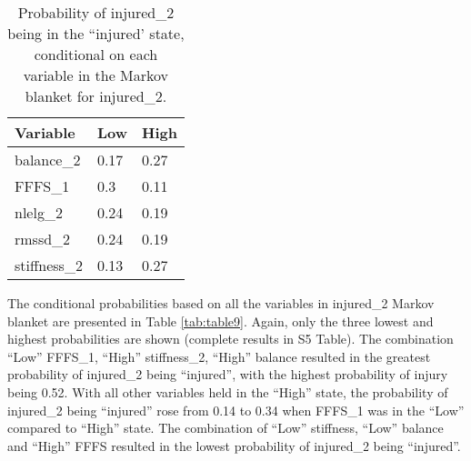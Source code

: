 \documentclass[
  english,
  man]{apa6}
\begin{document}
\begin{table}[H]

\caption{\label{tab:table8}Probability of injured\_2 being in the ``injured' state, conditional on each variable in the Markov blanket for injured\_2.}
\centering
\begin{tabular}[t]{l|l|l}
\hline
\textbf{Variable} & \textbf{Low} & \textbf{High}\\
\hline
balance\_2 & 0.17 & 0.27\\
\hline
FFFS\_1 & 0.3 & 0.11\\
\hline
nlelg\_2 & 0.24 & 0.19\\
\hline
rmssd\_2 & 0.24 & 0.19\\
\hline
stiffness\_2 & 0.13 & 0.27\\
\hline
\end{tabular}
\end{table}

The conditional probabilities based on all the variables in injured\_2 Markov blanket are presented in Table \ref{tab:table9}.
Again, only the three lowest and highest probabilities are shown (complete results in S5 Table).
The combination ``Low'' FFFS\_1, ``High'' stiffness\_2, ``High'' balance resulted in the greatest probability of injured\_2 being ``injured'', with the highest probability of injury being 0.52.
With all other variables held in the ``High'' state, the probability of injured\_2 being ``injured'' rose from 0.14 to 0.34 when FFFS\_1 was in the ``Low'' compared to ``High'' state.
The combination of ``Low'' stiffness, ``Low'' balance and ``High'' FFFS resulted in the lowest probability of injured\_2 being ``injured''.
\end{document}
